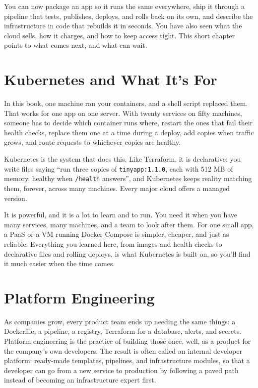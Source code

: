 
\begin{chapterintro}

You can now package an app so it runs the same everywhere, ship it through a pipeline that tests, publishes, deploys, and rolls back on its own, and describe the infrastructure in code that rebuilds it in seconds. You have also seen what the cloud sells, how it charges, and how to keep access tight. This short chapter points to what comes next, and what can wait.

\end{chapterintro}

\section{Kubernetes and What It's For}\label{13-where-to-go-from-here:kubernetes-and-what-its-for}

In this book, one machine ran your containers, and a shell script replaced them. That works for one app on one server. With twenty services on fifty machines, someone has to decide which container runs where, restart the ones that fail their health checks, replace them one at a time during a deploy, add copies when traffic grows, and route requests to whichever copies are healthy.

Kubernetes is the system that does this. Like Terraform, it is declarative: you write files saying ``run three copies of \texttt{tinyapp:1.1.0}, each with 512 MB of memory, healthy when \texttt{/health} answers'', and Kubernetes keeps reality matching them, forever, across many machines. Every major cloud offers a managed version.

It is powerful, and it is a lot to learn and to run. You need it when you have many services, many machines, and a team to look after them. For one small app, a PaaS or a VM running Docker Compose is simpler, cheaper, and just as reliable. Everything you learned here, from images and health checks to declarative files and rolling deploys, is what Kubernetes is built on, so you'll find it much easier when the time comes.

\section{Platform Engineering}\label{13-where-to-go-from-here:platform-engineering}

As companies grow, every product team ends up needing the same things: a Dockerfile, a pipeline, a registry, Terraform for a database, alerts, and secrets. Platform engineering is the practice of building those once, well, as a product for the company's own developers. The result is often called an internal developer platform: ready-made templates, pipelines, and infrastructure modules, so that a developer can go from a new service to production by following a paved path instead of becoming an infrastructure expert first.


